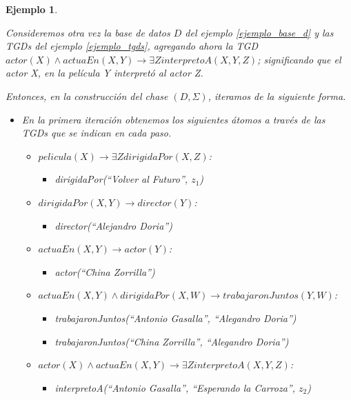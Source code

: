 \documentclass[11pt,a4paper,twoside]{tesis}
\newtheorem{exmp}{Ejemplo}
\begin{document}
\begin{exmp}\label{ejemplo_chase}

    Consideremos otra vez la base de datos $D$ del ejemplo \ref{ejemplo_base_d} y las TGDs del ejemplo \ref{ejemplo_tgds}, agregando ahora la TGD $actor(X) \land actuaEn(X, Y) \rightarrow \exists Z interpretoA(X, Y, Z)$; significando que el actor X, en la película Y interpretó al actor Z. 
    
    Entonces, en la construcción del chase $(D, \Sigma)$, iteramos de la siguiente forma.
    
    \begin{itemize}
        \item En la primera iteración obtenemos los siguientes átomos a través de las TGDs que se indican en cada paso.
        \begin{itemize}
            \item $pelicula(X) \rightarrow \exists Z dirigidaPor(X, Z)$:
            \begin{itemize}
                \item \textit{dirigidaPor(``Volver al Futuro'', $z_1$)}
            \end{itemize}
            \item $dirigidaPor(X, Y) \rightarrow director(Y)$:
            \begin{itemize}
                \item  \textit{director(``Alejandro Doria'')}
            \end{itemize}
            \item $actuaEn(X, Y) \rightarrow actor(Y)$:
            \begin{itemize}
                \item  \textit{actor(``China Zorrilla'')}
            \end{itemize}
            \item $actuaEn(X, Y) \land dirigidaPor(X, W) \rightarrow trabajaronJuntos(Y, W) $:
            \begin{itemize}
                \item  \textit{trabajaronJuntos(``Antonio Gasalla'', ``Alegandro Doria'')}
                \item  \textit{trabajaronJuntos(``China Zorrilla'', ``Alegandro Doria'')}
            \end{itemize}            
            \item $actor(X) \land actuaEn(X, Y) \rightarrow \exists Z interpretoA(X, Y, Z)$:
            \begin{itemize}
                \item  \textit{interpretoA(``Antonio Gasalla'', ``Esperando la Carroza'', $z_2$)}
            \end{itemize}
        \end{itemize}


\end{itemize}
\end{exmp}
\end{document}
